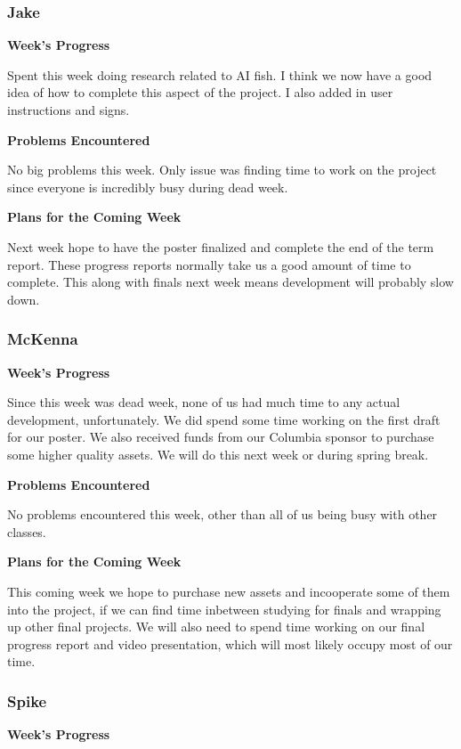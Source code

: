 \documentclass[10pt,journal,compsoc,onecolumn, draftclsnofoot]{IEEEtran}
\begin{document}
\subsubsection{Jake}
\noindent \textbf{Week's Progress}

Spent this week doing research related to AI fish. I think we now have a good idea of how to complete this aspect of the project. I also added in user instructions and signs.

\noindent \textbf{Problems Encountered}

No big problems this week. Only issue was finding time to work on the project since everyone is incredibly busy during dead week.

\noindent \textbf{Plans for the Coming Week}

Next week hope to have the poster finalized and complete the end of the term report. These progress reports normally take us a good amount of time to complete. This along with finals next week means development will probably slow down.

\subsubsection{McKenna}
\noindent \textbf{Week's Progress}

Since this week was dead week, none of us had much time to any actual development, unfortunately. We did spend some time working on the first draft for our poster. We also received funds from our Columbia sponsor to purchase some higher quality assets. We will do this next week or during spring break.

\noindent \textbf{Problems Encountered}

No problems encountered this week, other than all of us being busy with other classes.

\noindent \textbf{Plans for the Coming Week}

This coming week we hope to purchase new assets and incooperate some of them into the project, if we can find time inbetween studying for finals and wrapping up other final projects. We will also need to spend time working on our final progress report and video presentation, which will most likely occupy most of our time.

\subsubsection{Spike}
\noindent \textbf{Week's Progress}
\end{document}
